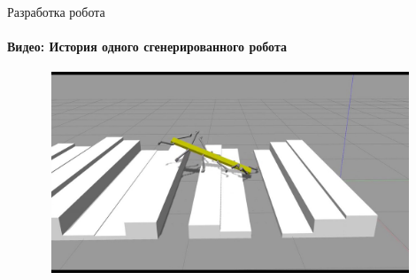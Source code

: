 \documentclass[aspectratio=169,xcolor=table]{beamer}
\begin{document}
\begin{frame}[t]{Разработка робота}
    \framesubtitle{Видео: История одного сгенерированного робота}
    \vspace{-0.6cm}
    \begin{figure}[H]
        \href{run:./videos/pass_rand_terr.mp4}{
            \centering\includegraphics[height=6cm,width=1\textwidth,keepaspectratio]{genetic_video_preview.jpg}}
    \end{figure}
\end{frame}
\end{document}
